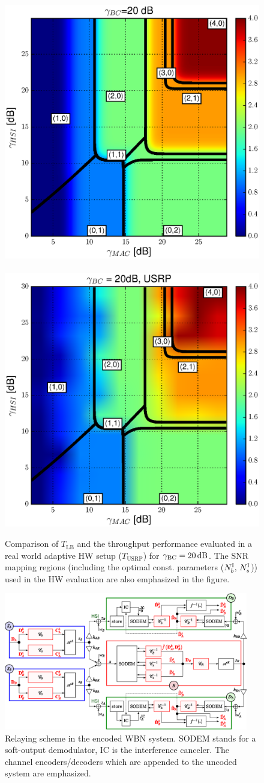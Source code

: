 \documentclass{article}
\begin{document}
\begin{figure}
\centering{}
\includegraphics[width=0.45\linewidth]{fig/XOR_map_Througput_BC20}
\,
\includegraphics[width=0.45\linewidth]{fig/XOR_map_Througput_USRP_BC20}
\caption{Comparison of $T_{\mathrm{LB}}$ and the throughput performance evaluated
in a real world adaptive HW setup ($T_{\mathrm{USRP}}$) for $\gamma_{{\rm {BC}}}=20\,\mathrm{dB}$.
The SNR mapping regions (including the optimal const. parameters ($N_{b}^{{\rm I}},\,N_{s}^{{\rm I}}$))
used in the HW evaluation are also emphasized in the figure.\label{fig:CTUpp_SNR_map_BC20_USRP}}
\vspace*{-4ex}
\end{figure}


\begin{figure}
\begin{centering}
\includegraphics[width=0.95\textwidth]{fig/butterfly-2level_processing_principleTWC-coded}
\par\end{centering}

\caption{Relaying scheme in the encoded WBN system. SODEM stands for a soft-output
demodulator, IC is the interference canceler. The channel encoders/decoders
which are appended to the uncoded system are emphasized. \label{fig:CTUpp_Information-flow-coded-block-scheme}}
\vspace*{-3ex}
\end{figure}
\end{document}
